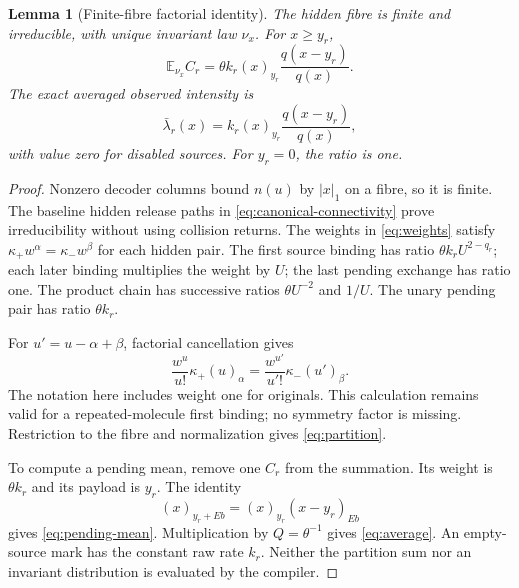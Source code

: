 \documentclass[11pt,reqno]{amsart}
\newtheorem{lemma}[theorem]{Lemma}
\theoremstyle{definition}
\theoremstyle{remark}
\newcommand{\E}{\mathbb E}
\begin{document}
\begin{lemma}[Finite-fibre factorial identity]\label{lem:fibre-law}
The hidden fibre is finite and irreducible, with unique invariant law
$\nu_x$. For $x\ge y_r$,
\begin{equation}\label{eq:pending-mean}
 \E_{\nu_x} C_r=\theta k_r(x)_{y_r}\frac{q(x-y_r)}{q(x)}.
\end{equation}
The exact averaged observed intensity is
\begin{equation}\label{eq:average}
 \bar\lambda_r(x)=k_r(x)_{y_r}\frac{q(x-y_r)}{q(x)},
\end{equation}
with value zero for disabled sources. For $y_r=0$, the ratio is one.
\end{lemma}
\begin{proof}
Nonzero decoder columns bound $n(u)$ by $|x|_1$ on a fibre, so it is finite.
The baseline hidden release paths in
\eqref{eq:canonical-connectivity} prove irreducibility without using collision
returns. The weights in \eqref{eq:weights} satisfy
$\kappa_+w^{\alpha}=\kappa_-w^{\beta}$ for each hidden pair.
The first source binding has ratio $\theta k_r U^{2-q_r}$; each later binding
multiplies the weight by $U$; the last pending exchange has ratio one. The
product chain has successive ratios $\theta U^{-2}$ and $1/U$. The unary
pending pair has ratio $\theta k_r$.

For $u'=u-\alpha+\beta$, factorial cancellation gives
\[
 \frac{w^u}{u!}\kappa_+(u)_\alpha
 =\frac{w^{u'}}{u'!}\kappa_-(u')_\beta.
\]
The notation here includes weight one for originals. This calculation remains
valid for a repeated-molecule first binding; no symmetry factor is missing.
Restriction to the fibre and normalization gives \eqref{eq:partition}.

To compute a pending mean, remove one $C_r$ from the summation. Its weight is
$\theta k_r$ and its payload is $y_r$. The identity
\[
 (x)_{y_r+Eb}=(x)_{y_r}(x-y_r)_{Eb}
\]
gives \eqref{eq:pending-mean}. Multiplication by $Q=\theta^{-1}$ gives
\eqref{eq:average}. An empty-source mark has the constant raw rate $k_r$.
Neither the partition sum nor an invariant distribution is evaluated by the
compiler.
\end{proof}
\end{document}
